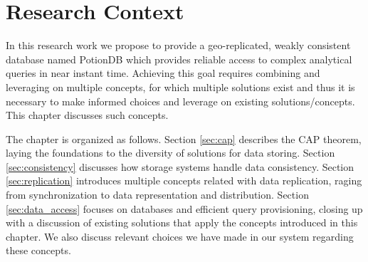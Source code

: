 
%

\chapter{Research Context}
\label{cha:research_context}


In this research work we propose to provide a geo-replicated, weakly consistent database named PotionDB which provides reliable access to complex analytical queries in near instant time.
Achieving this goal requires combining and leveraging on multiple concepts, for which multiple solutions exist and thus it is necessary to make informed choices and leverage on existing solutions/concepts.
This chapter discusses such concepts.

The chapter is organized as follows.
Section \ref{sec:cap} describes the CAP theorem, laying the foundations to the diversity of solutions for data storing.
Section \ref{sec:consistency} discusses how storage systems handle data consistency.
Section \ref{sec:replication} introduces multiple concepts related with data replication, raging from synchronization to data representation and distribution. 
Section \ref{sec:data_access} focuses on databases and efficient query provisioning, closing up with a discussion of existing solutions that apply the concepts introduced in this chapter.
We also discuss relevant choices we have made in our system regarding these concepts.


